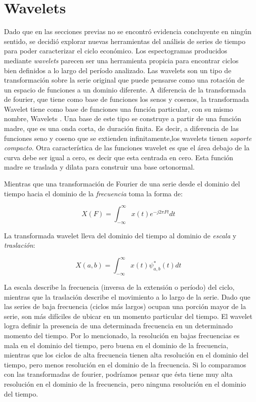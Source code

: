 \documentclass[a4paper]{article}
\begin{document}
\section{Wavelets}

Dado que en las secciones previas no se encontró evidencia concluyente en ningún sentido, se decidió explorar nuevas herramientas del análisis de series de tiempo para poder caracterizar el ciclo económico. Los espectogramas producidos mediante \textit{wavelets} parecen ser una herramienta propicia para encontrar ciclos bien definidos a lo largo del período analizado. Las wavelets son un tipo de transformación sobre la serie original que puede pensarse como una rotación de un espacio de funciones a un dominio diferente. A diferencia de la transformada de fourier, que tiene como base de funciones los senos y cosenos, la transformada Wavelet tiene como base de funciones una función particular, con su mismo nombre, Wavelets \cite{castro1995wavelets}. Una base de este tipo se construye a partir de una función madre, que es una onda corta, de duración finita. Es decir, a diferencia de las funciones seno y coseno que se extienden infinitamente,los wavelets tienen \textit{soporte compacto}. Otra característica de las funciones wavelet es que el área debajo de la curva debe ser igual a cero, es decir que esta centrada en cero. Esta función madre se traslada y dilata para construir una base ortonormal. 

Mientras que una transformación de Fourier de una serie desde el dominio del tiempo hacia el dominio de la \textit{frecuencia} toma la forma de:

$$
X(F)=\int_{-\infty}^{\infty} x(t) e^{-j2\pi Ft}dt
$$

La transformada wavelet lleva del dominio del tiempo al dominio de \textit{escala} y \textit{traslación}:

$$
X(a,b)=\int_{-\infty}^{\infty} x(t) \psi^*_{a,b}(t)dt
$$

La escala describe la frecuencia (inversa de la extensión o período) del ciclo, mientras que la traslación describe el movimiento a lo largo de la serie. Dado que las series de baja frecuencia (ciclos más largos) ocupan una porción mayor de la serie, son más difíciles de ubicar en un momento particular del tiempo. El wavelet logra definir la presencia de una determinada frecuencia en un determinado momento del tiempo. Por lo mencionado, la resolución en bajas frecuencias es mala en el dominio del tiempo, pero buena en el dominio de la frecuencia, mientras que los ciclos de alta frecuencia tienen alta resolución en el dominio del tiempo, pero menos resolución en el dominio de la frecuencia. Si lo comparamos con las transformadas de fourier, podríamos pensar que ésta tiene muy alta resolución en el dominio de la frecuencia, pero ninguna resolución en el dominio del tiempo. 
\end{document}
